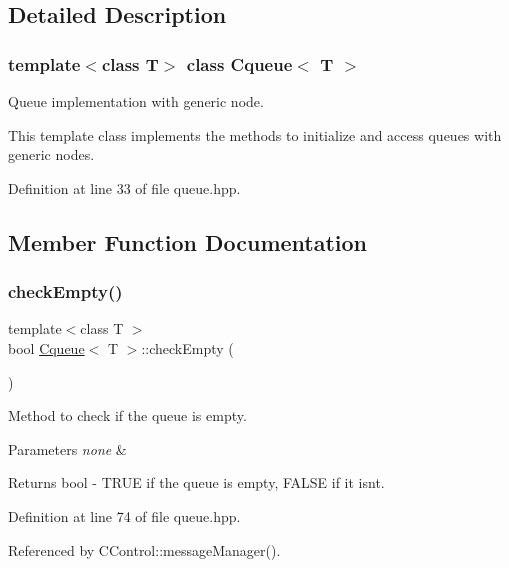 \subsection{Detailed Description}
\subsubsection*{template$<$class T$>$\newline
class Cqueue$<$ T $>$}

Queue implementation with generic node. 

This template class implements the methods to initialize and access queues with generic nodes. 

Definition at line 33 of file queue.\+hpp.



\subsection{Member Function Documentation}
\mbox{\label{class_cqueue_a7c20a21cd08b993af7222796322ccaec}} 
\subsubsection{\texorpdfstring{check\+Empty()}{checkEmpty()}}
{\footnotesize\ttfamily template$<$class T $>$ \\
bool \mbox{\hyperlink{class_cqueue}{Cqueue}}$<$ T $>$\+::check\+Empty (\begin{DoxyParamCaption}{ }\end{DoxyParamCaption})}



Method to check if the queue is empty. 


\begin{DoxyParams}{Parameters}
{\em none} & \\
\hline
\end{DoxyParams}
\begin{DoxyReturn}{Returns}
bool -\/ T\+R\+UE if the queue is empty, F\+A\+L\+SE if it isn\textquotesingle{}t. 
\end{DoxyReturn}


Definition at line 74 of file queue.\+hpp.



Referenced by C\+Control\+::message\+Manager().

